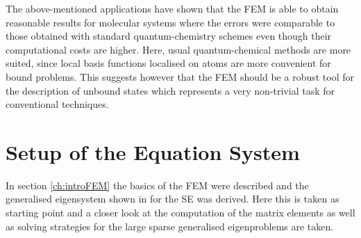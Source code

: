 The above-mentioned applications have shown that the FEM is able to obtain reasonable results for molecular systems where the errors were comparable to those obtained with standard quantum-chemistry schemes even though their computational costs are higher.
Here, usual quantum-chemical methods are more suited, since local basis functions localised on atoms are more convenient for bound problems.
This suggests however that the FEM should be a robust tool for the description of unbound states which represents a very non-trivial task for conventional techniques.

\section{Setup of the Equation System}
\label{ch:feInt}
In section \ref{ch:introFEM} the basics of the FEM were described and the generalised eigensystem shown in  for the SE was derived.
Here this is taken as starting point and a closer look at the computation of the matrix elements as well as solving strategies for the large sparse generalised eigenproblems are taken.

